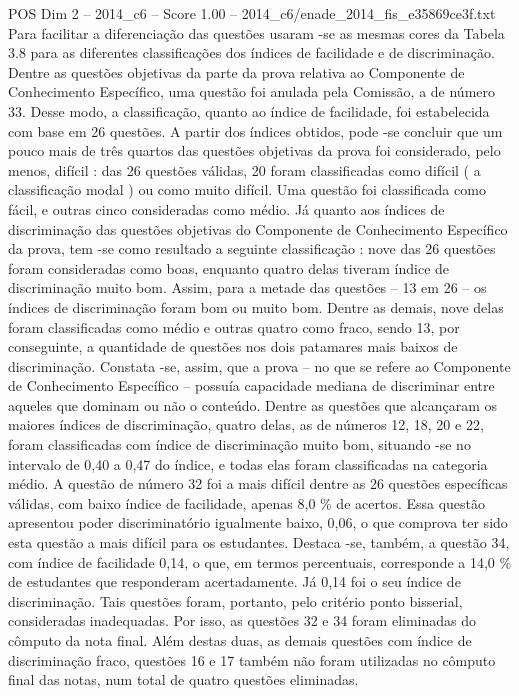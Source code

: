 \begin{textsample}{POS Dim 2 – 2014\_c6 – Score 1.00 – 2014\_c6/enade\_2014\_fis\_e35869ce3f.txt}
Para facilitar a diferenciação das questões usaram -se as mesmas cores da Tabela 3.8 para as diferentes classificações dos índices de facilidade e de discriminação.
Dentre as questões objetivas da parte da prova relativa ao Componente de Conhecimento Específico, uma questão foi anulada pela Comissão, a de número 33.
Desse modo, a classificação, quanto ao índice de facilidade, foi estabelecida com base em 26 questões.
A partir dos índices obtidos, pode -se concluir que um pouco mais de três quartos das questões objetivas da prova foi considerado, pelo menos, difícil : das 26 questões válidas, 20 foram classificadas como difícil ( a classificação modal ) ou como muito difícil.
Uma questão foi classificada como fácil, e outras cinco consideradas como médio.
Já quanto aos índices de discriminação das questões objetivas do Componente de Conhecimento Específico da prova, tem -se como resultado a seguinte classificação : nove das 26 questões foram consideradas como boas, enquanto quatro delas tiveram índice de discriminação muito bom.
Assim, para a metade das questões – 13 em 26 – os índices de discriminação foram bom ou muito bom.
Dentre as demais, nove delas foram classificadas como médio e outras quatro como fraco, sendo 13, por conseguinte, a quantidade de questões nos dois patamares mais baixos de discriminação.
Constata -se, assim, que a prova – no que se refere ao Componente de Conhecimento Específico – possuía capacidade mediana de discriminar entre aqueles que dominam ou não o conteúdo.
Dentre as questões que alcançaram os maiores índices de discriminação, quatro delas, as de números 12, 18, 20 e 22, foram classificadas com índice de discriminação muito bom, situando -se no intervalo de 0,40 a 0,47 do índice, e todas elas foram classificadas na categoria médio.
A questão de número 32 foi a mais difícil dentre as 26 questões específicas válidas, com baixo índice de facilidade, apenas 8,0 \% de acertos.
Essa questão apresentou poder discriminatório igualmente baixo, 0,06, o que comprova ter sido esta questão a mais difícil para os estudantes.
Destaca -se, também, a questão 34, com índice de facilidade 0,14, o que, em termos percentuais, corresponde a 14,0 \% de estudantes que responderam acertadamente.
Já 0,14 foi o seu índice de discriminação.
Tais questões foram, portanto, pelo critério ponto bisserial, consideradas inadequadas.
Por isso, as questões 32 e 34 foram eliminadas do cômputo da nota final.
Além destas duas, as demais questões com índice de discriminação fraco, questões 16 e 17 também não foram utilizadas no cômputo final das notas, num total de quatro questões eliminadas.

\end{textsample}
